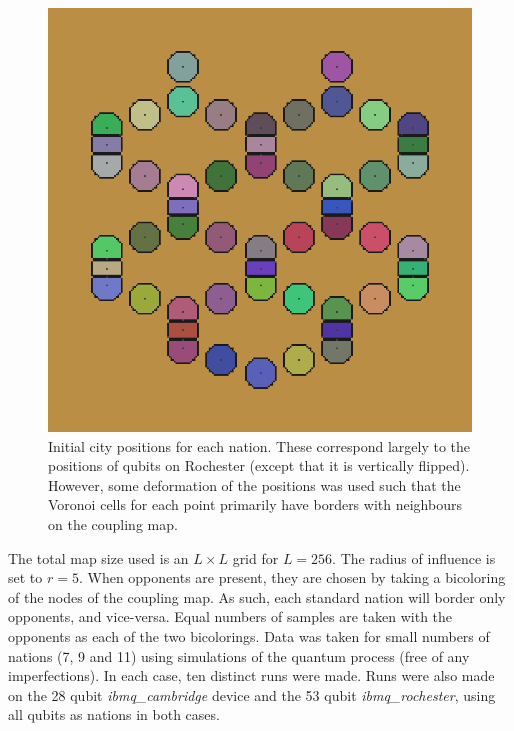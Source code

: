 \documentclass[conference]{IEEEtran}
\begin{document}
\begin{figure}[htbp]
\begin{center}
\includegraphics[width=0.95\columnwidth]{figures/initial.png}
\caption{Initial city positions for each nation. These correspond largely to the positions of qubits on Rochester (except that it is vertically flipped). However, some deformation of the positions was used such that the Voronoi cells for each point primarily have borders with neighbours on the coupling map.}
\label{initial}
\end{center}
\end{figure}


The total map size used is an $L \times L$ grid for $L=256$. The radius of influence is set to $r=5$. When opponents are present, they are chosen by taking a bicoloring of the nodes of the coupling map. As such, each standard nation will border only opponents, and vice-versa. Equal numbers of samples are taken with the opponents as each of the two bicolorings. Data was taken for small numbers of nations (7, 9 and 11) using simulations of the quantum process (free of any imperfections). In each case, ten distinct runs were made. Runs were also made on the 28 qubit \textit{ibmq\_cambridge} device and the 53 qubit \textit{ibmq\_rochester}, using all qubits as nations in both cases.
\end{document}
